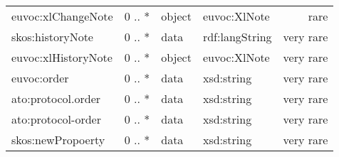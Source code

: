 \documentclass[10pt,a4paper,titlepage,final]{article}
\begin{document}
\begin{tabularx}{\textwidth}{lllXr}
     euvoc:xlChangeNote &      0 .. * &  object &                                       euvoc:XlNote &       rare \\
       skos:historyNote &      0 .. * &    data &                                     rdf:langString &  very rare \\
    euvoc:xlHistoryNote &      0 .. * &  object &                                       euvoc:XlNote &  very rare \\
            euvoc:order &      0 .. * &    data &                                         xsd:string &  very rare \\
     ato:protocol.order &      0 .. * &    data &                                         xsd:string &  very rare \\
     ato:protocol-order &      0 .. * &    data &                                         xsd:string &  very rare \\
      skos:newPropoerty &      0 .. * &    data &                                         xsd:string &  very rare \\
\end{tabularx}
\end{document}
